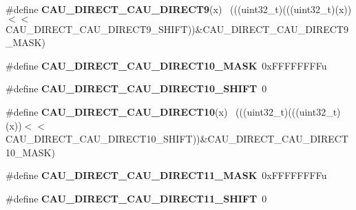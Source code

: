 \begin{DoxyCompactItemize}
\item 
\hypertarget{group___c_a_u___register___masks_ga75df250cd3c9e420779c836a098dfda4}{}\#define {\bfseries C\+A\+U\+\_\+\+D\+I\+R\+E\+C\+T\+\_\+\+C\+A\+U\+\_\+\+D\+I\+R\+E\+C\+T9}(x)                            ~(((uint32\+\_\+t)(((uint32\+\_\+t)(x))$<$$<$C\+A\+U\+\_\+\+D\+I\+R\+E\+C\+T\+\_\+\+C\+A\+U\+\_\+\+D\+I\+R\+E\+C\+T9\+\_\+\+S\+H\+I\+F\+T))\&C\+A\+U\+\_\+\+D\+I\+R\+E\+C\+T\+\_\+\+C\+A\+U\+\_\+\+D\+I\+R\+E\+C\+T9\+\_\+\+M\+A\+S\+K)\label{group___c_a_u___register___masks_ga75df250cd3c9e420779c836a098dfda4}

\item 
\hypertarget{group___c_a_u___register___masks_ga3115929e73e7c6a2c3b24d69e6215c55}{}\#define {\bfseries C\+A\+U\+\_\+\+D\+I\+R\+E\+C\+T\+\_\+\+C\+A\+U\+\_\+\+D\+I\+R\+E\+C\+T10\+\_\+\+M\+A\+S\+K}~0x\+F\+F\+F\+F\+F\+F\+F\+Fu\label{group___c_a_u___register___masks_ga3115929e73e7c6a2c3b24d69e6215c55}

\item 
\hypertarget{group___c_a_u___register___masks_gadc78db3adb857bc20e4387835eabdeab}{}\#define {\bfseries C\+A\+U\+\_\+\+D\+I\+R\+E\+C\+T\+\_\+\+C\+A\+U\+\_\+\+D\+I\+R\+E\+C\+T10\+\_\+\+S\+H\+I\+F\+T}~0\label{group___c_a_u___register___masks_gadc78db3adb857bc20e4387835eabdeab}

\item 
\hypertarget{group___c_a_u___register___masks_gab48d6ea88e714214bead7c52b700eb60}{}\#define {\bfseries C\+A\+U\+\_\+\+D\+I\+R\+E\+C\+T\+\_\+\+C\+A\+U\+\_\+\+D\+I\+R\+E\+C\+T10}(x)                          ~(((uint32\+\_\+t)(((uint32\+\_\+t)(x))$<$$<$C\+A\+U\+\_\+\+D\+I\+R\+E\+C\+T\+\_\+\+C\+A\+U\+\_\+\+D\+I\+R\+E\+C\+T10\+\_\+\+S\+H\+I\+F\+T))\&C\+A\+U\+\_\+\+D\+I\+R\+E\+C\+T\+\_\+\+C\+A\+U\+\_\+\+D\+I\+R\+E\+C\+T10\+\_\+\+M\+A\+S\+K)\label{group___c_a_u___register___masks_gab48d6ea88e714214bead7c52b700eb60}

\item 
\hypertarget{group___c_a_u___register___masks_gaf2b9a81af0187f3bb946b6d0a371a05f}{}\#define {\bfseries C\+A\+U\+\_\+\+D\+I\+R\+E\+C\+T\+\_\+\+C\+A\+U\+\_\+\+D\+I\+R\+E\+C\+T11\+\_\+\+M\+A\+S\+K}~0x\+F\+F\+F\+F\+F\+F\+F\+Fu\label{group___c_a_u___register___masks_gaf2b9a81af0187f3bb946b6d0a371a05f}

\item 
\hypertarget{group___c_a_u___register___masks_ga5a79ec46736566014503f1858c92f19e}{}\#define {\bfseries C\+A\+U\+\_\+\+D\+I\+R\+E\+C\+T\+\_\+\+C\+A\+U\+\_\+\+D\+I\+R\+E\+C\+T11\+\_\+\+S\+H\+I\+F\+T}~0\label{group___c_a_u___register___masks_ga5a79ec46736566014503f1858c92f19e}


\end{DoxyCompactItemize}
